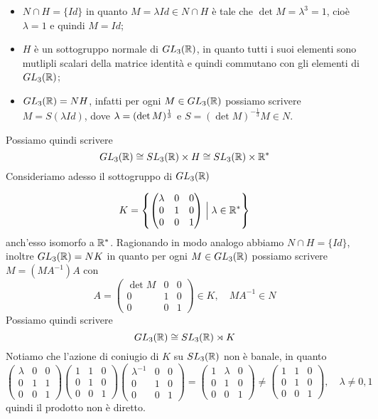 \documentclass[11pt]{scrartcl}
\begin{document}
\begin{itemize}
    \item $N \cap H = \{Id\}$ in quanto $M = \lambda Id \in N\cap H$ è tale
    che $\det M = \lambda^3 = 1$, cioè $\lambda = 1$ e quindi $M = Id$;
    \item $H$ è un sottogruppo normale di $GL_3(\mathbb R)$, in quanto tutti i suoi elementi
    sono mutlipli scalari della matrice identità e quindi commutano con gli
    elementi di $GL_3(\mathbb R)$;
    \item $GL_3(\mathbb R) = NH$, infatti per ogni $M \in GL_3(\mathbb R)$ possiamo scrivere $M = S(\lambda Id)$,
    dove $\lambda = \nolinebreak(\det M)^{\frac 1 3}$ e $S = (\det M)^{-\frac 1 3} M \in N$.
\end{itemize}

Possiamo quindi scrivere 
\[
    GL_3(\mathbb R) \cong SL_3(\mathbb R) \times H \cong SL_3(\mathbb R)\times \mathbb R^*
\]
Consideriamo adesso il sottogruppo di $GL_3(\mathbb R)$

\[
    K = \left\{\begin{pmatrix}
        \lambda & 0 & 0\\
        0 & 1 & 0\\
        0 & 0 & 1
    \end{pmatrix}\Bigm| \lambda \in \mathbb R^* \right\}
\]
anch'esso isomorfo a $\mathbb R^*$. Ragionando in modo analogo abbiamo $N \cap H = \{Id\}$, 
inoltre $GL_3(\mathbb R) = NK$ in quanto per ogni $M \in GL_3(\mathbb R)$ possiamo scrivere
$M = (MA^{-1})A$ con 
\[
    A = \begin{pmatrix}
        \det M & 0 & 0\\
        0 & 1 & 0\\
        0 & 0 & 1
    \end{pmatrix} \in K, \quad MA^{-1} \in N
\]
Possiamo quindi scrivere 
\[
    GL_3(\mathbb R) \cong SL_3(\mathbb R)\rtimes K
\]
Notiamo che l'azione di coniugio di $K$ su $SL_3(\mathbb R)$ non è banale, in 
quanto
\[
    \begin{pmatrix}
        \lambda & 0 & 0\\
        0 & 1 & 1\\
        0 & 0 & 1
    \end{pmatrix}
    \begin{pmatrix}
        1 & 1 & 0\\
        0 & 1 & 0\\
        0 & 0 & 1
    \end{pmatrix}
    \begin{pmatrix}
        \lambda^{-1}& 0 & 0\\
        0 & 1 & 0\\
        0 & 0 & 1
    \end{pmatrix} = 
    \begin{pmatrix}
        1 & \lambda & 0\\
        0 & 1 & 0\\
        0 & 0 & 1
    \end{pmatrix} \neq \begin{pmatrix}
        1 & 1 & 0\\
        0 & 1 & 0\\
        0 & 0 & 1
    \end{pmatrix},\quad \lambda \neq 0, 1
\]
quindi il prodotto non è diretto.
\end{document}
